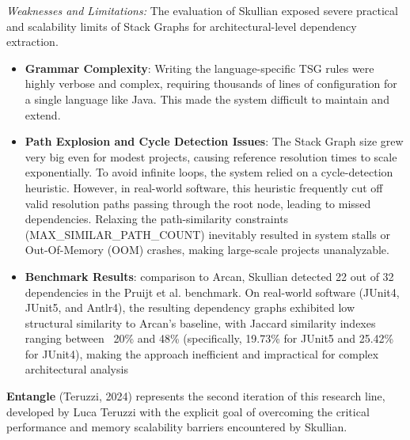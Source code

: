 \textit{Weaknesses and Limitations:} The evaluation of Skullian
exposed severe practical and scalability limits of Stack Graphs for
architectural-level dependency extraction.
\begin{itemize}
  \item \textbf{Grammar Complexity}: Writing the language-specific
    TSG rules were highly verbose and complex, requiring thousands of
    lines of configuration for a single language like Java. This made
    the system difficult to maintain and extend.
  \item \textbf{Path Explosion and Cycle Detection Issues}: The Stack
    Graph size grew very big even for modest projects, causing
    reference resolution times to scale exponentially. To avoid
    infinite loops, the system relied on a cycle-detection heuristic.
    However, in real-world software, this heuristic frequently cut
    off valid resolution paths passing through the root node, leading
    to missed dependencies. Relaxing the path-similarity constraints
    (MAX\_SIMILAR\_PATH\_COUNT) inevitably resulted in system stalls or
    Out-Of-Memory (OOM) crashes, making large-scale projects unanalyzable.
  \item \textbf{Benchmark Results}:  comparison to Arcan, Skullian
    detected 22 out of 32 dependencies in the Pruijt et al.
    benchmark. On real-world software (JUnit4, JUnit5, and Antlr4),
    the resulting dependency graphs exhibited low structural
    similarity to Arcan's baseline, with Jaccard similarity indexes
    ranging between ~20\% and 48\% (specifically, 19.73\% for JUnit5 and
    25.42\% for JUnit4), making the approach inefficient and
    impractical for complex architectural analysis
\end{itemize}

\textbf{Entangle} (Teruzzi, 2024) \cite{teruzzi_2024} represents the
second iteration of this research line, developed by Luca Teruzzi
with the explicit goal of overcoming the critical performance and
memory scalability barriers encountered by Skullian.

